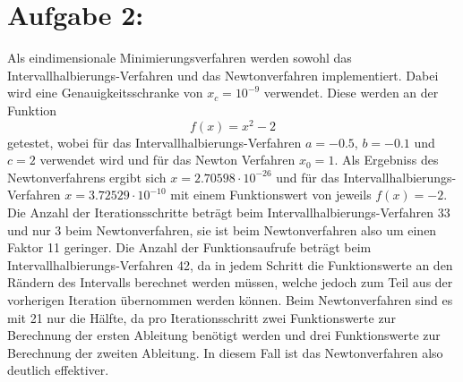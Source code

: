 \section*{Aufgabe 2: }



Als eindimensionale Minimierungsverfahren werden sowohl das Intervallhalbierungs-Verfahren und das
Newtonverfahren implementiert. Dabei wird eine Genauigkeitsschranke von $x_c=10^{-9}$ verwendet.
Diese werden an der Funktion
\begin{equation}
  f(x)=x^2-2
\end{equation}
getestet, wobei für das Intervallhalbierungs-Verfahren $a=-0.5$, $b=-0.1$ und $c=2$ verwendet wird und
für das Newton Verfahren $x_0=1$.
Als Ergebniss des Newtonverfahrens ergibt sich $ {x=2.70598\cdot 10^{-26}}$ und für das Intervallhalbierungs-Verfahren ${x=3.72529\cdot 10^{-10}}$ mit einem Funktionswert von jeweils ${f(x)=-2}$.
Die Anzahl der Iterationsschritte beträgt beim Intervallhalbierungs-Verfahren 33 und nur 3 beim Newtonverfahren, sie ist beim Newtonverfahren also um einen Faktor 11 geringer. Die Anzahl der Funktionsaufrufe beträgt beim Intervallhalbierungs-Verfahren
42, da in jedem Schritt die Funktionswerte an den Rändern des Intervalls berechnet werden müssen, welche jedoch zum Teil aus der vorherigen Iteration übernommen werden können. Beim Newtonverfahren sind
es mit 21 nur die Hälfte, da pro Iterationsschritt zwei Funktionswerte zur Berechnung der ersten Ableitung benötigt werden und drei Funktionswerte zur Berechnung der zweiten Ableitung. In diesem Fall ist das Newtonverfahren also deutlich effektiver.
